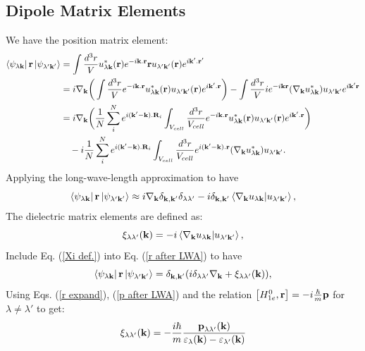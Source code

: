 \documentclass[12pt,english,a4paper]{article}
\begin{document}
\begin{appendices}
\section{Dipole Matrix Elements}
\label{Dipole Matrix Elements}
\quad We have the position matrix element:
\begin{align}
\bra{\psi_{\lambda \textbf{k}}}\textbf{r}\ket{\psi_{\lambda'\textbf{k}'}} &= \int \frac{d^3 r}{V} u^*_{\lambda \textbf{k}}(\textbf{r}) e^{-i\textbf{k}.\textbf{r}} \textbf{r} u_{\lambda' \textbf{k}'}(\textbf{r}) e^{i\textbf{k}'.\textbf{r}'}\\
&= i \nabla_\textbf{k} \bigg(\int \frac{d^3 r}{V} e^{-i\textbf{k}.\textbf{r}}u^*_{\lambda \textbf{k}}(\textbf{r}) u_{\lambda' \textbf{k}'}(\textbf{r})e^{i\textbf{k}'.\textbf{r}}\bigg) - \int \frac{d^3 r}{V} i e^{-i\textbf{k}\textbf{r}}(\nabla_\textbf{k} u^*_{\lambda \textbf{k}}) u_{\lambda' \textbf{k}'} e^{i\textbf{k}'\textbf{r}}\nonumber\\
&= i \nabla_\textbf{k} \bigg(\frac{1}{N} \sum_{i}^N e^{i(\textbf{k}'-\textbf{k}).\textbf{R}_i}\int_{V_{cell}} \frac{d^3 r}{V_{cell}} e^{-i\textbf{k}.\textbf{r}}u^*_{\lambda \textbf{k}}(\textbf{r}) u_{\lambda' \textbf{k}'}(\textbf{r})e^{i\textbf{k}'.\textbf{r}}\bigg)\nonumber\\
&\quad  - i\frac{1}{N}\sum_{i}^N e^{i(\textbf{k}'-\textbf{k}).\textbf{R}_i} \int_{V_{cell}} \frac{d^3 r}{V_{cell}} e^{i(\textbf{k}'-\textbf{k}).\textbf{r}} (\nabla_\textbf{k} u^*_{\lambda \textbf{k}}) u_{\lambda' \textbf{k}'}.
\end{align}
\quad Applying the long-wave-length approximation to have
\begin{equation}
	\label{r after LWA}
	\bra{\psi_{\lambda \textbf{k}}}\textbf{r}\ket{\psi_{\lambda'\textbf{k}'}} \approx i \nabla_{\textbf{k}} \delta_{\textbf{k},\textbf{k}'}\delta_{\lambda \lambda'} - i \delta_{\textbf{k},\textbf{k}'} \braket{\nabla_\textbf{k}u_{\lambda \textbf{k}}}{u_{\lambda'\textbf{k}'}},
\end{equation}
\quad The dielectric matrix elements are defined as:
\begin{equation}
	\label{Xi def.}
	\xi_{\lambda\lambda'}(\textbf{k}) = - i \braket{\nabla_\textbf{k}u_{\lambda \textbf{k}}}{u_{\lambda'\textbf{k}'}},
\end{equation}
\quad Include Eq. (\ref{Xi def.}) into Eq. (\ref{r after LWA}) to have
\begin{equation}
	\label{r expand}
	\bra{\psi_{\lambda \textbf{k}}}\textbf{r}\ket{\psi_{\lambda'\textbf{k}'}} = \delta_{\textbf{k},\textbf{k}'}(i\delta_{\lambda \lambda'} \nabla_{\textbf{k}}  +  \xi_{\lambda\lambda'}(\textbf{k})),
\end{equation}
\quad Using Eqs. (\ref{r expand}), (\ref{p after LWA}) and the relation $\comm{H^0_{1e}}{\textbf{r}} = -i\frac{\hbar}{m}\textbf{p}$ for $\lambda \neq \lambda'$ to get:
\begin{equation}
	\xi_{\lambda\lambda'}(\textbf{k}) = -\frac{i\hbar}{m}\frac{\textbf{p}_{\lambda\lambda'}(\textbf{k})}{\varepsilon_{\lambda}(\textbf{\textbf{k}}) - \varepsilon_{\lambda'}(\textbf{k})}
\end{equation}\end{appendices}
\newpage


\end{document}

